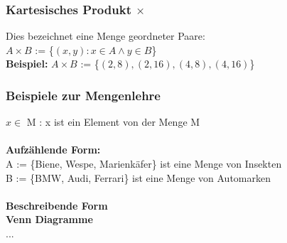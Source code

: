 \documentclass[a4paper,12pt]{article}
\begin{document}
\subsubsection{Kartesisches Produkt $\times$}
Dies bezeichnet eine Menge geordneter Paare: \\
$A \times B$ := \{$(x, y) : x \in A \land y \in B$\} \\
\textbf{Beispiel:} $A \times B$ := \{$(2,8), (2,16), (4,8), (4,16)$\}









\subsubsection*{Beispiele zur Mengenlehre}
$x \in $ M : x ist ein Element von der Menge M \\
\\
\textbf{Aufzählende Form:} \\
A := \{Biene, Wespe, Marienkäfer\} ist eine Menge von Insekten \\
B := \{BMW, Audi, Ferrari\} ist eine Menge von Automarken \\
\\
\textbf{Beschreibende Form} \\
\textbf{Venn Diagramme} \\
...
\end{document}

